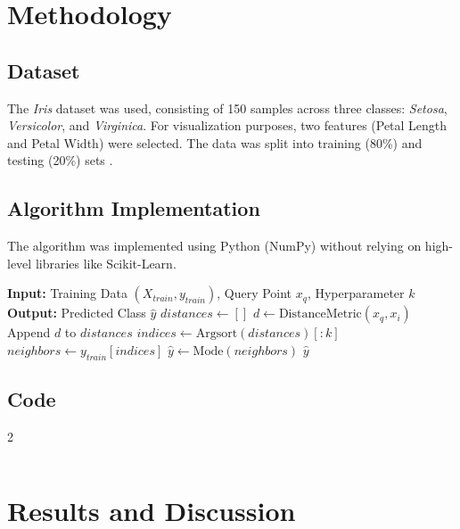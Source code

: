 \documentclass[11pt]{article}
\begin{document}
\section{Methodology}

\subsection{Dataset}
The \textit{Iris} dataset was used, consisting of 150 samples across three classes: \textit{Setosa}, \textit{Versicolor}, and \textit{Virginica}. For visualization purposes, two features (Petal Length and Petal Width) were selected. The data was split into training (80\%) and testing (20\%) sets \cite{fisher1936use}.

\subsection{Algorithm Implementation}
The algorithm was implemented using Python (NumPy) without relying on high-level libraries like Scikit-Learn.

\begin{algorithm}[H]
    \caption{K-Nearest Neighbors (Prediction Phase)}
    \begin{algorithmic}[1]
        \State \textbf{Input:} Training Data $(X_{train}, y_{train})$, Query Point $x_q$, Hyperparameter $k$
        \State \textbf{Output:} Predicted Class $\hat{y}$
        \State $distances \gets []$
        \State $d \gets \text{DistanceMetric}(x_q, x_i)$ 
        \State Append $d$ to $distances$
        \EndFor
        \State $indices \gets \text{Argsort}(distances)[:k]$ 
        \State $neighbors \gets y_{train}[indices]$
        \State $\hat{y} \gets \text{Mode}(neighbors)$ 
        \State \Return $\hat{y}$
        \EndFunction
    \end{algorithmic}
\end{algorithm}

\subsection{Code}
\begin{multicols}{2}
    \inputminted{Python}{./assets/knn.py}
\end{multicols}

\section{Results and Discussion}
\end{document}
